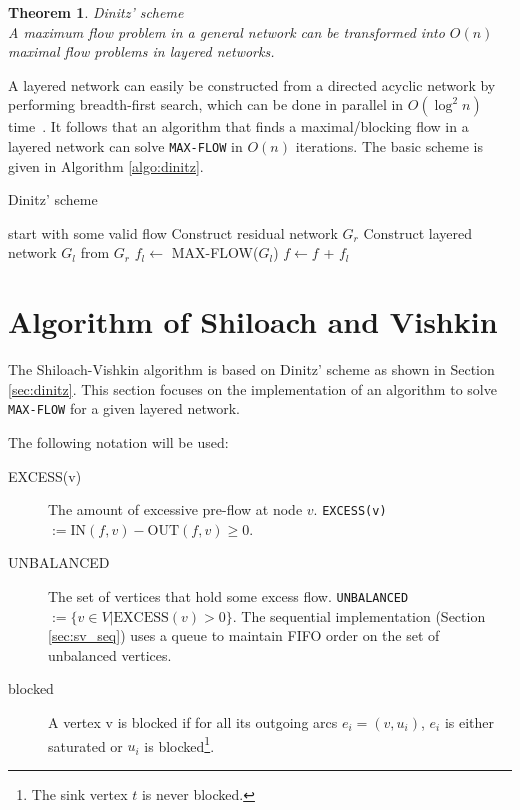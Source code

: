 \documentclass[a4paper,10pt, twocolumn]{article}
\newtheorem{theorem}[lemma]{Theorem}
\begin{document}
\begin{theorem}
\textit{Dinitz' scheme}~\cite{dinitz70} \\
A maximum flow problem in a general network can be transformed into $O(n)$ maximal flow problems in layered networks.
\end{theorem}

A layered network can easily be constructed from a directed acyclic network by performing breadth-first search, which can be done in parallel in $O(\log^{2}n)$ time~\cite{yossi81}. It follows that an algorithm that finds a maximal/blocking flow in a layered network can solve \lstinline|MAX-FLOW| in $O(n)$ iterations. The basic scheme is given in Algorithm \ref{algo:dinitz}.

\begin{algorithm}
\caption{Dinitz' scheme}
\label{algo:dinitz}
\begin{algorithmic}[1]
	\State start with some valid flow 
		\State Construct residual network $G_r$ %
		\State Construct layered network $G_l$ from $G_r$ %
		\State $f_l \gets$ MAX-FLOW($G_l$)  %
		\State $f \gets f$ + $f_l$ %
	\EndWhile
	\EndFunction
\end{algorithmic}
\end{algorithm}

\section{Algorithm of Shiloach and Vishkin}
\label{sec:shiloach}
The Shiloach-Vishkin algorithm is based on Dinitz' scheme as shown in Section \ref{sec:dinitz}. This section focuses on the implementation of an algorithm to solve \lstinline|MAX-FLOW| for a given layered network.

The following notation will be used:
\begin{description}
	\item [EXCESS(v)] The amount of excessive pre-flow at node $v$. \lstinline|EXCESS(v)| $ := \mathrm{IN}(f,v) - \mathrm{OUT}(f,v) \geq 0$.
	\item[UNBALANCED] The set of vertices that hold some excess flow. \lstinline|UNBALANCED| $ := \{v \in V \lvert \mathrm{EXCESS}(v) > 0 \}$. The sequential implementation (Section \ref{sec:sv_seq}) uses a queue to maintain FIFO order on the set of unbalanced vertices.
	\item[blocked] A vertex v is blocked if for all its outgoing arcs $e_i = (v, u_i)$, $e_i$ is either saturated or $u_i$ is blocked\footnote{The sink vertex $t$ is never blocked.}. 
\end{description}
	
\end{document}

